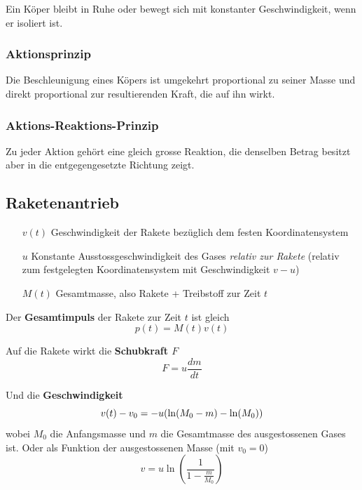 \documentclass[7pt]{article}
\begin{document}
\begin{multicols*}{3}
Ein K{\"o}per bleibt in Ruhe oder bewegt sich mit konstanter Geschwindigkeit, wenn er isoliert ist.

\subsubsection{Aktionsprinzip}

Die Beschleunigung eines K{\"o}pers ist umgekehrt proportional zu seiner Masse und direkt proportional zur resultierenden Kraft, die auf ihn wirkt. 

\subsubsection{Aktions-Reaktions-Prinzip}

Zu jeder Aktion geh{\"o}rt eine gleich grosse Reaktion, die denselben Betrag besitzt aber in die entgegengesetzte Richtung zeigt.

\subsection{Raketenantrieb}

\begin{enumerate}
	\item [$v(t)$] Geschwindigkeit der Rakete bez{\"u}glich dem festen Koordinatensystem
	\item [$u$] Konstante Ausstossgeschwindigkeit des Gases \emph{relativ zur Rakete} (relativ zum festgelegten Koordinatensystem mit Geschwindigkeit $v-u$)
	\item [$M(t)$] Gesamtmasse, also Rakete + Treibstoff zur Zeit $t$
\end{enumerate}

Der \textbf{Gesamtimpuls} der Rakete zur Zeit $t$ ist gleich
\begin{equation*}
	p(t) = M(t)v(t)
\end{equation*}

Auf die Rakete wirkt die \textbf{Schubkraft $F$}
\begin{equation*}
	F = u\frac{dm}{dt}
\end{equation*}

Und die \textbf{Geschwindigkeit}
\begin{equation*}
	v(t) - v_0 = -u(\ln(M_0 - m) - \ln(M_0))\\
\end{equation*}
wobei $M_0$ die Anfangsmasse und $m$ die Gesamtmasse des ausgestossenen Gases ist. \newline
Oder als Funktion der ausgestossenen Masse (mit $v_0 = 0$)
\begin{equation*}
	v = u\ln(\frac{1}{1-\frac{m}{M_0}})
\end{equation*}


\end{multicols*}
\end{document}
